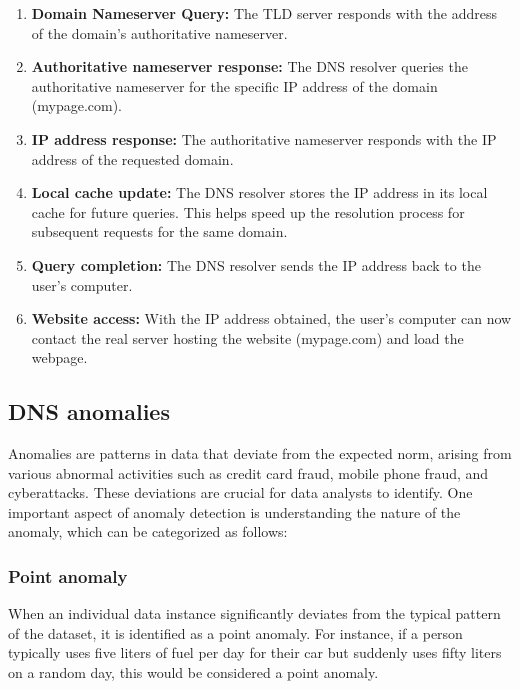 \begin{enumerate}
	\item \textbf{Domain Nameserver Query:} The TLD server responds with the address of the domain's authoritative nameserver.
	
	\item \textbf{Authoritative nameserver response:} The DNS resolver queries the authoritative nameserver for the specific IP address of the domain (mypage.com).
	
	\item \textbf{IP address response:} The authoritative nameserver responds with the IP address of the requested domain.
	
	\item \textbf{Local cache update:} The DNS resolver stores the IP address in its local cache for future queries. This helps speed up the resolution process for subsequent requests for the same domain.
	
	\item \textbf{Query completion:} The DNS resolver sends the IP address back to the user's computer.
	
	\item \textbf{Website access:} With the IP address obtained, the user's computer can now contact the real server hosting the website (mypage.com) and load the webpage.
\end{enumerate}



\subsection{DNS anomalies}
Anomalies are patterns in data that deviate from the expected norm, arising from various abnormal activities such as credit card fraud, mobile phone fraud, and cyberattacks. These deviations are crucial for data analysts to identify. One important aspect of anomaly detection is understanding the nature of the anomaly, which can be categorized as follows:\\

\subsubsection{ Point anomaly}
When an individual data instance significantly deviates from the typical pattern of the dataset, it is identified as a point anomaly. For instance, if a person typically uses five liters of fuel per day for their car but suddenly uses fifty liters on a random day, this would be considered a point anomaly.

